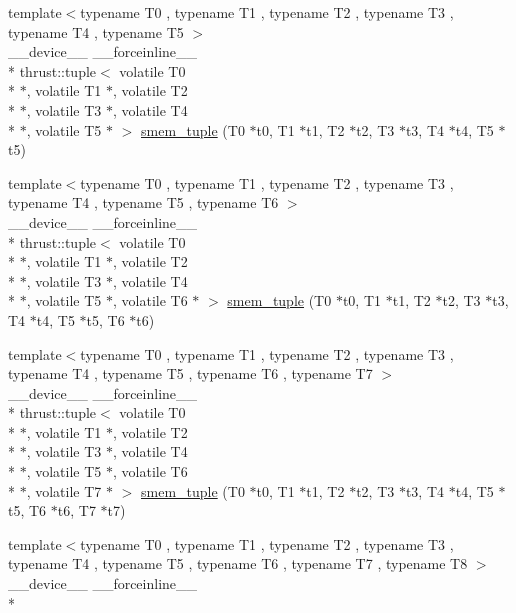\begin{DoxyCompactItemize}
\item 
{\footnotesize template$<$typename T0 , typename T1 , typename T2 , typename T3 , typename T4 , typename T5 $>$ }\\\-\_\-\-\_\-device\-\_\-\-\_\- \-\_\-\-\_\-forceinline\-\_\-\-\_\- \\*
thrust\-::tuple$<$ volatile T0 \\*
$\ast$, volatile T1 $\ast$, volatile T2 \\*
$\ast$, volatile T3 $\ast$, volatile T4 \\*
$\ast$, volatile T5 $\ast$ $>$ \hyperlink{namespacecv_1_1gpu_1_1device_af0c383ca5d947c73133b5c86a1ad62c8}{smem\-\_\-tuple} (T0 $\ast$t0, T1 $\ast$t1, T2 $\ast$t2, T3 $\ast$t3, T4 $\ast$t4, T5 $\ast$t5)
\item 
{\footnotesize template$<$typename T0 , typename T1 , typename T2 , typename T3 , typename T4 , typename T5 , typename T6 $>$ }\\\-\_\-\-\_\-device\-\_\-\-\_\- \-\_\-\-\_\-forceinline\-\_\-\-\_\- \\*
thrust\-::tuple$<$ volatile T0 \\*
$\ast$, volatile T1 $\ast$, volatile T2 \\*
$\ast$, volatile T3 $\ast$, volatile T4 \\*
$\ast$, volatile T5 $\ast$, volatile T6 $\ast$ $>$ \hyperlink{namespacecv_1_1gpu_1_1device_aa6545a498efe2b6dde3aedc33057fd78}{smem\-\_\-tuple} (T0 $\ast$t0, T1 $\ast$t1, T2 $\ast$t2, T3 $\ast$t3, T4 $\ast$t4, T5 $\ast$t5, T6 $\ast$t6)
\item 
{\footnotesize template$<$typename T0 , typename T1 , typename T2 , typename T3 , typename T4 , typename T5 , typename T6 , typename T7 $>$ }\\\-\_\-\-\_\-device\-\_\-\-\_\- \-\_\-\-\_\-forceinline\-\_\-\-\_\- \\*
thrust\-::tuple$<$ volatile T0 \\*
$\ast$, volatile T1 $\ast$, volatile T2 \\*
$\ast$, volatile T3 $\ast$, volatile T4 \\*
$\ast$, volatile T5 $\ast$, volatile T6 \\*
$\ast$, volatile T7 $\ast$ $>$ \hyperlink{namespacecv_1_1gpu_1_1device_acc811db08902e97351dbe90dfbf23588}{smem\-\_\-tuple} (T0 $\ast$t0, T1 $\ast$t1, T2 $\ast$t2, T3 $\ast$t3, T4 $\ast$t4, T5 $\ast$t5, T6 $\ast$t6, T7 $\ast$t7)
\item 
{\footnotesize template$<$typename T0 , typename T1 , typename T2 , typename T3 , typename T4 , typename T5 , typename T6 , typename T7 , typename T8 $>$ }\\\-\_\-\-\_\-device\-\_\-\-\_\- \-\_\-\-\_\-forceinline\-\_\-\-\_\- \\*

\end{DoxyCompactItemize}
